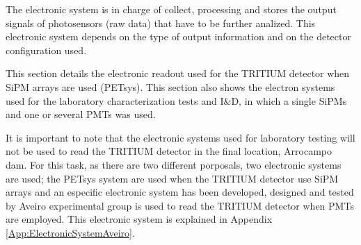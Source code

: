 The electronic system is in charge of collect, processing and stores the output signals of photosensors (raw data) that have to be further analized. This electronic system depends on the type of output information and on the detector configuration used.

This section details the electronic readout used for the TRITIUM detector when SiPM arrays are used (PETsys). This section also shows the electron systems used for the laboratory characterization tests and I\&D, in which a single SiPMs and one or several PMTs was used.

It is important to note that the electronic systems used for laboratory testing will not be used to read the TRITIUM detector in the final location, Arrocampo dam. For this task, as there are two different porposals, two electronic systems are used; the PETsys system are used when the TRITIUM detector use SiPM arrays and an especific electronic system has been developed, designed and tested by Aveiro experimental group is used to read the TRITIUM detector when PMTs are employed. This electronic system is explained in Appendix \ref{App:ElectronicSystemAveiro}.


 